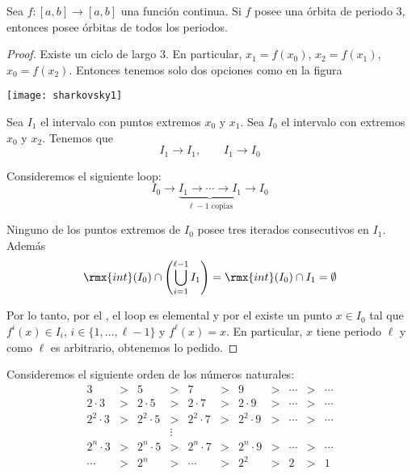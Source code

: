 \documentclass[	docname= Sistemas\ Din\'amicos,
				finished=1,
				semester=1,
				year=2017,
				professor=Godofredo\ Iommi,
				sigla=MAT2565]{apunte}
\begin{document}
\begin{teo}[Li-Yorke '75] Sea $f: [a,b] \to [a,b]$ una función continua. Si $f$ posee una órbita de periodo 3, entonces posee órbitas de todos los periodos. 
\end{teo}

\begin{proof} Existe un ciclo de largo 3. En particular, $x_{1} = f(x_{0})$, $x_{2} = f(x_{1})$, $x_{0} = f(x_{2})$. Entonces tenemos solo dos opciones como en la figura
	\begin{center}
		\texttt{[image: sharkovsky1]}
	\end{center}

Sea $I_{1}$ el intervalo con puntos extremos $x_{0}$ y $x_{1}$. Sea $I_{0}$ el intervalo con extremos $x_{0}$ y $x_{2}$. Tenemos que
	$$I_{1} \to I_{1}, \qquad I_{1} \to I_{0}$$

Consideremos el siguiente loop:
	$$I_{0} \to \underbrace{I_{1} \to \cdots \to I_{1}}_{\ell-1 \text{ copias}} \to I_{0} $$

Ninguno de los puntos extremos de $I_{0}$ posee tres iterados consecutivos en $I_{1}$. Además
	$$\rmx{int}(I_{0}) \cap \left(\bigcup_{i=1}^{\ell -1} I_{1}\right) = \rmx{int}(I_{0}) \cap I_{1} = \emptyset$$

Por lo tanto, por el , el loop es elemental y por el  existe un punto $x \in I_{0}$ tal que $f^{i}(x) \in I_{i}$, $i \in \{1, \ldots, \ell -1\}$ y $f^{\ell}(x) = x$. En particular, $x$ tiene periodo $\ell$ y como $\ell$ es arbitrario, obtenemos lo pedido.
\end{proof}

\begin{defn} Consideremos el siguiente orden de los números naturales:
	$$\begin{array}{ccccccccccc}
		3			&	>	&	5			&	>	&	7			&	>	&	9			&	>	&	\cdots	&	>	&	\cdots	\\	
		2\cdot 3		&	>	&	2\cdot 5		&	>	&	2\cdot 7		&	>	&	2\cdot 9		&	>	&	\cdots	&	>	&	\cdots\\
		2^{2}\cdot 3	&	>	&	2^{2}\cdot 5	&	>	&	2^{2}\cdot 7	&	>	&	2^{2}\cdot 9	&	>	&	\cdots	&	>	&	\cdots\\
					&		&				&	\vdots&				&		&				&		&			&		&\\
		2^{n}\cdot 3	&	>	&	2^{n}\cdot 5	&	>	&	2^{n}\cdot 7	&	>	&	2^{n}\cdot 9	&	>	&	\cdots	&	>	&	\cdots\\
		\cdots		&	>	&	2^{n}			&	>	&	\cdots		&	>	&	2^{2}			&	>	&	2		&	>	&	1	
	\end{array}$$
\end{defn}
\end{document}
